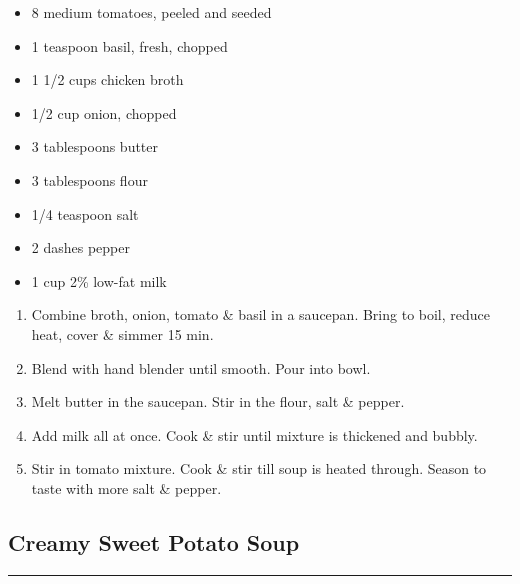 \documentclass{article}
\begin{document}
\begin{framed}
    \begin{itemize}
        \item 8 medium tomatoes, peeled and seeded
        \item 1 teaspoon basil, fresh, chopped
        \item 1 1/2 cups chicken broth
        \item 1/2 cup onion, chopped
        \item 3 tablespoons butter
        \item 3 tablespoons flour
        \item 1/4 teaspoon salt
        \item 2 dashes pepper
        \item 1 cup 2\% low-fat milk
    \end{itemize}
\end{framed}

\begin{enumerate}
    \item 
        Combine broth, onion, tomato \& basil in a saucepan. Bring to boil, reduce heat, cover \& simmer 15 min.
    \item 
        Blend with hand blender until smooth. Pour into bowl.
    \item
        Melt butter in the saucepan. Stir in the flour, salt \& pepper.
    \item 
        Add milk all at once. Cook \& stir until mixture is thickened and bubbly.
    \item 
        Stir in tomato mixture. Cook \& stir till soup is heated through. Season to taste with more salt \& pepper.
\end{enumerate}
\newpage

\subsection{Creamy Sweet Potato Soup} 
\noindent\rule[0.5ex]{\linewidth}{1pt}
\end{document}
